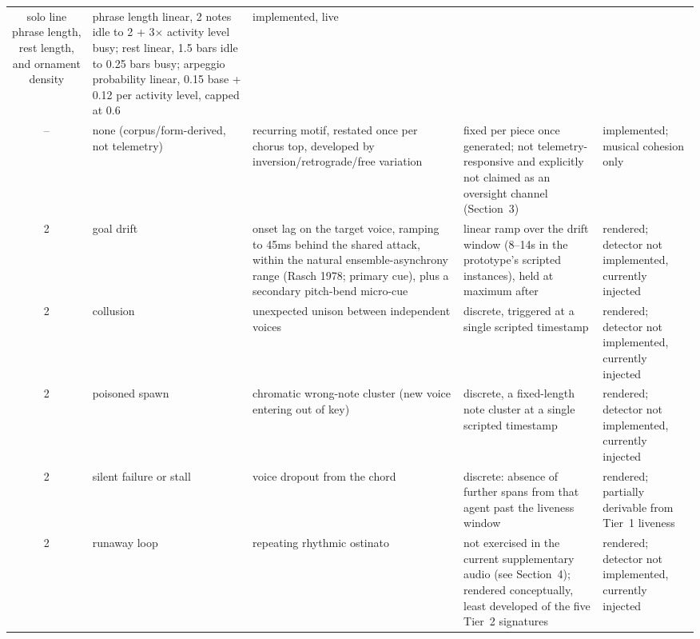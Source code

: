 \begin{table}[t]
\begin{tabular}{@{}cllll@{}}
  solo line phrase length, rest length, and ornament density &
  phrase length linear, 2 notes idle to 2 + 3$\times$ activity level busy; rest linear,
  1.5 bars idle to 0.25 bars busy; arpeggio probability linear, 0.15 base + 0.12 per activity
  level, capped at 0.6 & implemented, live \\
-- & none (corpus/form-derived, not telemetry) &
  recurring motif, restated once per chorus top, developed by inversion/retrograde/free variation &
  fixed per piece once generated; not telemetry-responsive and explicitly not claimed as an
  oversight channel (Section~3) & implemented; musical cohesion only \\
2 & goal drift &
  onset lag on the target voice, ramping to 45ms behind the shared attack, within the natural
  ensemble-asynchrony range (Rasch 1978; primary cue), plus a secondary pitch-bend micro-cue &
  linear ramp over the drift window (8--14s in the prototype's scripted instances), held at
  maximum after & rendered; detector not implemented, currently injected \\
2 & collusion & unexpected unison between independent voices &
  discrete, triggered at a single scripted timestamp & rendered; detector not implemented,
  currently injected \\
2 & poisoned spawn & chromatic wrong-note cluster (new voice entering out of key) &
  discrete, a fixed-length note cluster at a single scripted timestamp &
  rendered; detector not implemented, currently injected \\
2 & silent failure or stall & voice dropout from the chord &
  discrete: absence of further spans from that agent past the liveness window &
  rendered; partially derivable from Tier~1 liveness \\
2 & runaway loop & repeating rhythmic ostinato &
  not exercised in the current supplementary audio (see Section~4); rendered conceptually,
  least developed of the five Tier~2 signatures & rendered; detector not implemented,
  currently injected \\
\bottomrule
\end{tabular}
\end{table}
